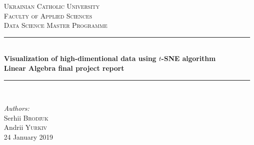 \begin{titlepage}

\newcommand{\HRule}{\rule{\linewidth}{0.5mm}} %

\center %
 

\textsc{\LARGE Ukrainian Catholic University}\\[1cm] %
\textsc{\Large  Faculty of Applied Sciences}\\[0.5cm] %
\textsc{\large Data Science Master Programme}\\[0.5cm] %

\vspace*{1cm}

\HRule \\[0.4cm]
{ \huge \bfseries Visualization of high-dimentional data using $t$-SNE algorithm}\\[10pt]
{\Large \bfseries Linear Algebra final project report}\\[0.4cm] %
\HRule \\[1cm]
 
\vspace*{1cm}

\Large \emph{Authors:}\\
Serhii \textsc{Brodiuk}\\Andrii \textsc{Yurkiv}\\[1cm] %

\vspace*{1cm}
{\large 24 January 2019}\\[2cm] %


\end{titlepage}
